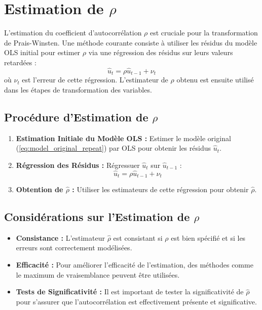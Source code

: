 \documentclass[14pt]{extarticle} %
\theoremstyle{definition}
\theoremstyle{plain}
\begin{document}
\section{Estimation de \( \rho \)}
L'estimation du coefficient d'autocorrélation \( \rho \) est cruciale pour la transformation de Prais-Winsten. Une méthode courante consiste à utiliser les résidus du modèle OLS initial pour estimer \( \rho \) via une régression des résidus sur leurs valeurs retardées :
\[
\hat{u}_t = \rho \hat{u}_{t-1} + \nu_t
\]
où \( \nu_t \) est l'erreur de cette régression. L'estimateur de \( \rho \) obtenu est ensuite utilisé dans les étapes de transformation des variables.

\subsection{Procédure d'Estimation de \( \rho \)}
\begin{enumerate}
    \item \textbf{Estimation Initiale du Modèle OLS :} Estimer le modèle original (\ref{eq:model_original_repeat}) par OLS pour obtenir les résidus \( \hat{u}_t \).
    \item \textbf{Régression des Résidus :} Régressuer \( \hat{u}_t \) sur \( \hat{u}_{t-1} \) :
    \[
    \hat{u}_t = \rho \hat{u}_{t-1} + \nu_t
    \]
    \item \textbf{Obtention de \( \hat{\rho} \) :} Utiliser les estimateurs de cette régression pour obtenir \( \hat{\rho} \).
\end{enumerate}

\subsection{Considérations sur l'Estimation de \( \rho \)}
\begin{itemize}
    \item \textbf{Consistance :} L'estimateur \( \hat{\rho} \) est consistant si \( \rho \) est bien spécifié et si les erreurs sont correctement modélisées.
    \item \textbf{Efficacité :} Pour améliorer l'efficacité de l'estimation, des méthodes comme le maximum de vraisemblance peuvent être utilisées.
    \item \textbf{Tests de Significativité :} Il est important de tester la significativité de \( \hat{\rho} \) pour s'assurer que l'autocorrélation est effectivement présente et significative.
\end{itemize}
\end{document}

